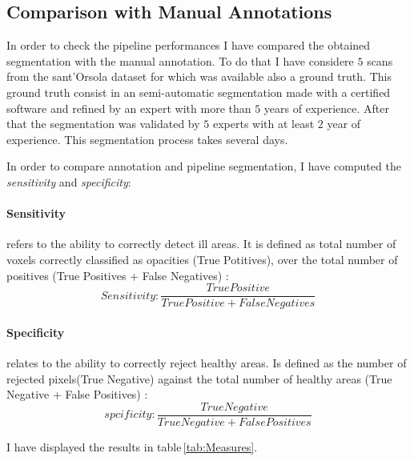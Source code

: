 \documentclass{standalone}
\begin{document}
	\subsection{Comparison with Manual Annotations}
	
	In order to check the pipeline performances I have compared the  obtained segmentation with the manual annotation. To do that I have considere $5$ scans from the sant'Orsola dataset for which was available also a ground truth. This ground truth consist in an semi-automatic segmentation made with a certified software and refined by an expert with more than $5$ years of experience. After that the segmentation was validated by $5$ experts with at least $2$ year of experience. This segmentation process takes several days. 
	
	In order to compare annotation and pipeline segmentation, I have computed the \emph{sensitivity} and \emph{specificity}: 
	
	\paragraph{Sensitivity} refers to the ability to correctly detect ill areas. It is defined as total number of voxels correctly classified as opacities (True Potitives), over the total number of positives (True Positives + False Negatives) : 
	\begin{equation}\label{eq:sensitivity}
		Sensitivity : \frac{True Positive}{True Positive + False Negatives}
	\end{equation}

	\paragraph{Specificity} relates to the  ability to correctly reject healthy areas. Is defined as the number of rejected pixels(True Negative) against the total number of healthy areas (True Negative + False Positives) : 
	\begin{equation}
		spcificity : \frac{True Negative}{True Negative + False Positives}
	\end{equation}

	I have displayed the results in table\,\ref{tab:Measures}. 
	
\end{document}
